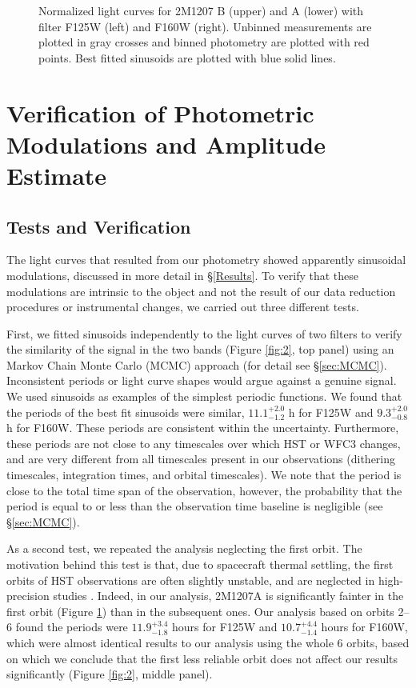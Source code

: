\documentclass[apj]{emulateapj}
\newcommand{\reviseTwo}[1]{\textbf{{\color{cyan}{#1}}}}
\renewcommand{\reviseTwo}{}
\newcommand{\Jperiod}{$11.1^{+2.0}_{{-1.2}}$}
\newcommand{\Jperiodd}{$11.9^{+3.4}_{-1.8}$}
\newcommand{\Hperiod}{$9.3^{+2.0}_{{-0.8}}$}
\newcommand{\Hperiodd}{$10.7^{+4.4}_{{-1.4}}$}
\begin{document}
  \begin{figure}
  \centering
  \caption{Normalized light curves for 2M1207 B (upper) and A (lower)
    with filter F125W (left) and F160W (right). Unbinned
  measurements are plotted in gray crosses and binned photometry are
  plotted with red points. Best fitted sinusoids are plotted
  with blue solid lines.}
  \label{fig:3}
\end{figure}

\section{Verification of Photometric Modulations and Amplitude
  Estimate}



\subsection{Tests and Verification}

The light curves that resulted from our photometry showed apparently
sinusoidal modulations, discussed in more detail in
\S\ref{Results}. To verify that these modulations are intrinsic to
the object and not the result of our data reduction procedures or 
instrumental changes, we carried out three different tests.

First, we fitted sinusoids independently to the light curves of two
filters to verify the similarity of the signal in the two bands
(Figure \ref{fig:2}, top panel) \reviseTwo{using an Markov Chain Monte Carlo (MCMC)
 approach (for detail see \S\ref{sec:MCMC})}. Inconsistent periods or light curve
shapes would argue against a genuine signal. \reviseTwo{We used
  sinusoids as examples of the simplest periodic functions.} We found that the periods
of the best fit sinusoids were similar, \Jperiod{} h for
F125W and \Hperiod{} h for F160W. These periods are consistent
within the uncertainty. Furthermore, these periods are not close to
any timescales over which HST or WFC3 changes, and are
very different from all timescales present in our observations
(dithering timescales, integration times, and orbital
timescales). \reviseTwo{We note that the period is close to
  the total time span of the observation, however, the probability that
  the period  is equal to or less than the observation time baseline is
  negligible (see \S\ref{sec:MCMC}).}

As a second test, we repeated the analysis neglecting the first
orbit. The motivation behind this test is that, due to spacecraft
thermal settling, the first orbits of HST observations are often
slightly unstable, and are neglected in high-precision studies
\citep[e.g.][]{Mandell2013}. Indeed, in our analysis, 2M1207A is
significantly fainter in the first orbit (Figure \ref{fig:3}) than in
the subsequent ones.  \reviseTwo{Our analysis based on orbits 2--6 found the
periods were \Jperiodd{} hours for F125W and \Hperiodd{} hours for F160W, }
which were almost identical results to our analysis using the whole 6 orbits, based on
which we conclude that the first less reliable orbit does not affect
our results significantly (Figure \ref{fig:2}, middle panel).
\end{document}
